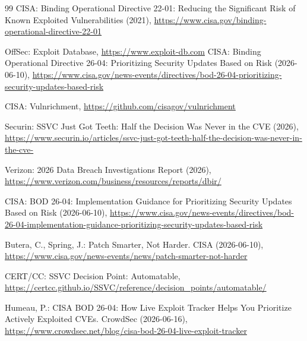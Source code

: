 \documentclass[runningheads]{llncs}
\begin{document}
\begin{thebibliography}{99}
CISA: Binding Operational Directive 22-01: Reducing the Significant Risk of Known Exploited
Vulnerabilities (2021), \url{https://www.cisa.gov/binding-operational-directive-22-01}

OffSec: Exploit Database, \url{https://www.exploit-db.com}
CISA: Binding Operational Directive 26-04: Prioritizing Security Updates Based on Risk (2026-06-10),
\url{https://www.cisa.gov/news-events/directives/bod-26-04-prioritizing-security-updates-based-risk}

CISA: Vulnrichment, \url{https://github.com/cisagov/vulnrichment}

Securin: SSVC Just Got Teeth: Half the Decision Was Never in the CVE (2026),
\url{https://www.securin.io/articles/ssvc-just-got-teeth-half-the-decision-was-never-in-the-cve-}

Verizon: 2026 Data Breach Investigations Report (2026),
\url{https://www.verizon.com/business/resources/reports/dbir/}

CISA: BOD 26-04: Implementation Guidance for Prioritizing Security Updates Based on Risk (2026-06-10),
\url{https://www.cisa.gov/news-events/directives/bod-26-04-implementation-guidance-prioritizing-security-updates-based-risk}

Butera, C., Spring, J.: Patch Smarter, Not Harder. CISA (2026-06-10),
\url{https://www.cisa.gov/news-events/news/patch-smarter-not-harder}

CERT/CC: SSVC Decision Point: Automatable,
\url{https://certcc.github.io/SSVC/reference/decision_points/automatable/}

Humeau, P.: CISA BOD 26-04: How Live Exploit Tracker Helps You Prioritize Actively Exploited CVEs. CrowdSec (2026-06-16),
\url{https://www.crowdsec.net/blog/cisa-bod-26-04-live-exploit-tracker}

\end{thebibliography}
\end{document}
